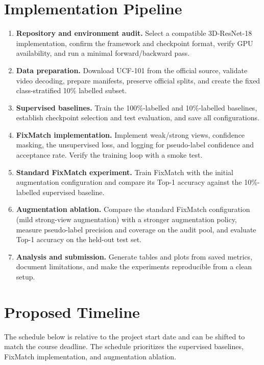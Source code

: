 \documentclass[11pt,a4paper]{article}
\begin{document}
\section{Implementation Pipeline}
\begin{enumerate}[label=\textbf{Phase \arabic*:},leftmargin=2.4cm]
  \item \textbf{Repository and environment audit.} Select a compatible 3D-ResNet-18 implementation, confirm the framework and checkpoint format, verify GPU availability, and run a minimal forward/backward pass.
  \item \textbf{Data preparation.} Download UCF-101 from the official source, validate video decoding, prepare manifests, preserve official splits, and create the fixed class-stratified 10\% labelled subset.
  \item \textbf{Supervised baselines.} Train the 100\%-labelled and 10\%-labelled baselines, establish checkpoint selection and test evaluation, and save all configurations.
  \item \textbf{FixMatch implementation.} Implement weak/strong views, confidence masking, the unsupervised loss, and logging for pseudo-label confidence and acceptance rate. Verify the training loop with a smoke test.
  \item \textbf{Standard FixMatch experiment.} Train FixMatch with the initial augmentation configuration and compare its Top-1 accuracy against the 10\%-labelled supervised baseline.
  \item \textbf{Augmentation ablation.} Compare the standard FixMatch configuration (mild strong-view augmentation) with a stronger augmentation policy, measure pseudo-label precision and coverage on the audit pool, and evaluate Top-1 accuracy on the held-out test set.
  \item \textbf{Analysis and submission.} Generate tables and plots from saved metrics, document limitations, and make the experiments reproducible from a clean setup.
\end{enumerate}



\section{Proposed Timeline}
The schedule below is relative to the project start date and can be shifted to match the course deadline. The schedule prioritizes the supervised baselines, FixMatch implementation, and augmentation ablation.
\end{document}
